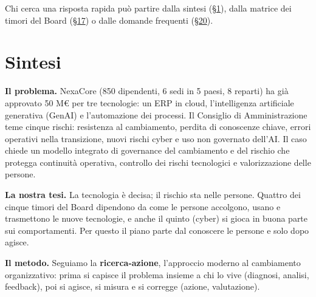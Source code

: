\documentclass[11pt,a4paper]{article}
\begin{document}
Chi cerca una risposta rapida può partire dalla sintesi (\hyperref[sec:1]{\S1}), dalla matrice dei timori del Board (\hyperref[sec:17]{\S17}) o dalle domande frequenti (\hyperref[sec:20]{\S20}).

\section{Sintesi}\label{sec:1}

\textbf{Il problema.} NexaCore (850 dipendenti, 6 sedi in 5 paesi, 8 reparti) ha già approvato 50 M€ per tre tecnologie: un ERP in cloud, l'intelligenza artificiale generativa (GenAI) e l'automazione dei processi. Il Consiglio di Amministrazione teme cinque rischi: resistenza al cambiamento, perdita di conoscenze chiave, errori operativi nella transizione, nuovi rischi cyber e uso non governato dell'AI. Il caso chiede un modello integrato di governance del cambiamento e del rischio che protegga continuità operativa, controllo dei rischi tecnologici e valorizzazione delle persone.

\textbf{La nostra tesi.} La tecnologia è decisa; il rischio sta nelle persone. Quattro dei cinque timori del Board dipendono da come le persone accolgono, usano e trasmettono le nuove tecnologie, e anche il quinto (cyber) si gioca in buona parte sui comportamenti. Per questo il piano parte dal conoscere le persone e solo dopo agisce.

\textbf{Il metodo.} Seguiamo la \textbf{ricerca-azione}, l'approccio moderno al cambiamento organizzativo: prima si capisce il problema insieme a chi lo vive (diagnosi, analisi, feedback), poi si agisce, si misura e si corregge (azione, valutazione).
\end{document}
